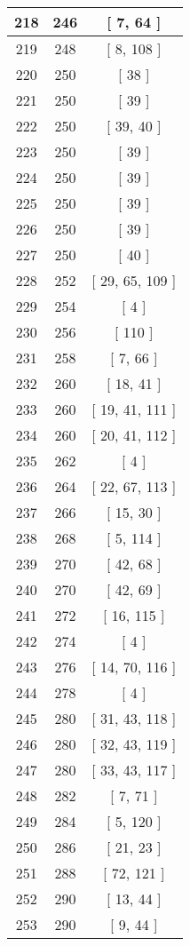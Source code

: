 \begin{center}
\begin{longtable}[H]{|| c c c ||}
\hline
218 & 246 & [ 7, 64 ] \\ 
\hline
219 & 248 & [ 8, 108 ] \\ 
\hline
220 & 250 & [ 38 ] \\ 
\hline
221 & 250 & [ 39 ] \\ 
\hline
222 & 250 & [ 39, 40 ] \\ 
\hline
223 & 250 & [ 39 ] \\ 
\hline
224 & 250 & [ 39 ] \\ 
\hline
225 & 250 & [ 39 ] \\ 
\hline
226 & 250 & [ 39 ] \\ 
\hline
227 & 250 & [ 40 ] \\ 
\hline
228 & 252 & [ 29, 65, 109 ] \\ 
\hline
229 & 254 & [ 4 ] \\ 
\hline
230 & 256 & [ 110 ] \\ 
\hline
231 & 258 & [ 7, 66 ] \\ 
\hline
232 & 260 & [ 18, 41 ] \\ 
\hline
233 & 260 & [ 19, 41, 111 ] \\ 
\hline
234 & 260 & [ 20, 41, 112 ] \\ 
\hline
235 & 262 & [ 4 ] \\ 
\hline
236 & 264 & [ 22, 67, 113 ] \\ 
\hline
237 & 266 & [ 15, 30 ] \\ 
\hline
238 & 268 & [ 5, 114 ] \\ 
\hline
239 & 270 & [ 42, 68 ] \\ 
\hline
240 & 270 & [ 42, 69 ] \\ 
\hline
241 & 272 & [ 16, 115 ] \\ 
\hline
242 & 274 & [ 4 ] \\ 
\hline
243 & 276 & [ 14, 70, 116 ] \\ 
\hline
244 & 278 & [ 4 ] \\ 
\hline
245 & 280 & [ 31, 43, 118 ] \\ 
\hline
246 & 280 & [ 32, 43, 119 ] \\ 
\hline
247 & 280 & [ 33, 43, 117 ] \\ 
\hline
248 & 282 & [ 7, 71 ] \\ 
\hline
249 & 284 & [ 5, 120 ] \\ 
\hline
250 & 286 & [ 21, 23 ] \\ 
\hline
251 & 288 & [ 72, 121 ] \\ 
\hline
252 & 290 & [ 13, 44 ] \\ 
\hline
253 & 290 & [ 9, 44 ] \\ 

\end{longtable}
\end{center}
